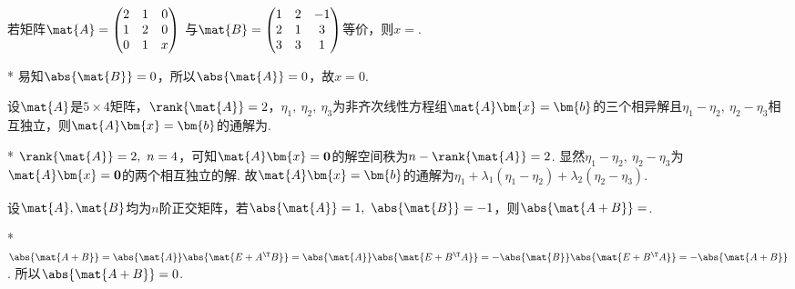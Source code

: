 \begin{problem}[向量组及其秩]
    若矩阵$\mat{A}=\begin{pmatrix}
        2 & 1 & 0\\1 & 2 & 0\\0 & 1 &x
    \end{pmatrix}$
    与$\mat{B}=\begin{pmatrix}
        1 & 2 & -1\\2 & 1 & 3\\3 & 3 & 1
    \end{pmatrix}$等价，则$x=$.
\end{problem}
\begin{solution}*
    易知$\abs{\mat{B}}=0$，所以$\abs{\mat{A}}=0$，故$x=0$.
\end{solution}

\begin{problem}[线性方程组的解释理论]
    设$\mat{A}$是$5\times 4$矩阵，$\rank{\mat{A}}=2$，$\eta_1,\ \eta_2,\ \eta_3$为非齐次线性方程组$\mat{A}\bm{x}=\bm{b}$的三个相异解且$\eta_1-\eta_2,\ \eta_2-\eta_3$相互独立，则$\mat{A}\bm{x}=\bm{b}$的通解为.
\end{problem}
\begin{solution}*
    $\rank{\mat{A}}=2,\ n=4$，可知$\mat{A}\bm{x}=\bf{0}$的解空间秩为$n-\rank{\mat{A}}=2$. 显然$\eta_1-\eta_2,\ \eta_2-\eta_3$为$\mat{A}\bm{x}=\bf{0}$的两个相互独立的解. 故$\mat{A}\bm{x}=\bm{b}$的通解为$\eta_1+\lambda_1(\eta_1-\eta_2)+\lambda_2(\eta_2-\eta_3)$.
\end{solution}


\begin{problem}
    设$\mat{A},\mat{B}$均为$n$阶正交矩阵，若$\abs{\mat{A}}=1,\ \abs{\mat{B}}=-1$，则$\abs{\mat{A+B}}=$.
\end{problem}
\begin{solution}*
    $\abs{\mat{A+B}}=\abs{\mat{A}}\abs{\mat{E+A^\T B}}=\abs{\mat{A}}\abs{\mat{E+B^\T A}}=-\abs{\mat{B}}\abs{\mat{E+B^\T A}}=-\abs{\mat{A+B}}$. 所以$\abs{\mat{A+B}}=0$.
\end{solution}

